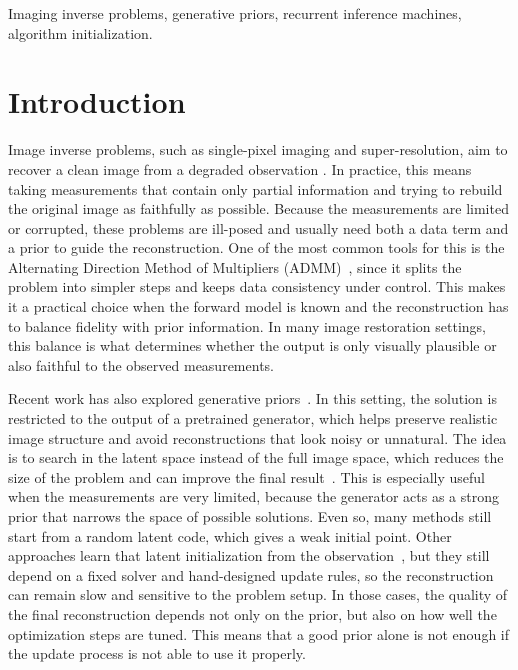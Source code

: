 \documentclass[conference]{IEEEtran}
\begin{document}
\begin{IEEEkeywords}
Imaging inverse problems, generative priors, recurrent inference machines, algorithm initialization.
\end{IEEEkeywords}

\section{Introduction}
Image inverse problems, such as single-pixel imaging and super-resolution, aim to recover a clean image from a degraded observation \cite{bertero2021introduction}. In practice, this means taking measurements that contain only partial information and trying to rebuild the original image as faithfully as possible. Because the measurements are limited or corrupted, these problems are ill-posed and usually need both a data term and a prior to guide the reconstruction. One of the most common tools for this is the Alternating Direction Method of Multipliers (ADMM)~\cite{neal2011distributed}, since it splits the problem into simpler steps and keeps data consistency under control. This makes it a practical choice when the forward model is known and the reconstruction has to balance fidelity with prior information. In many image restoration settings, this balance is what determines whether the output is only visually plausible or also faithful to the observed measurements.

Recent work has also explored generative priors~\cite{bora2017compressed, latorre2019fast}. In this setting, the solution is restricted to the output of a pretrained generator, which helps preserve realistic image structure and avoid reconstructions that look noisy or unnatural. The idea is to search in the latent space instead of the full image space, which reduces the size of the problem and can improve the final result~\cite{bora2017compressed}. This is especially useful when the measurements are very limited, because the generator acts as a strong prior that narrows the space of possible solutions. Even so, many methods still start from a random latent code, which gives a weak initial point. Other approaches learn that latent initialization from the observation~\cite{gutierrez2025learned}, but they still depend on a fixed solver and hand-designed update rules, so the reconstruction can remain slow and sensitive to the problem setup. In those cases, the quality of the final reconstruction depends not only on the prior, but also on how well the optimization steps are tuned. This means that a good prior alone is not enough if the update process is not able to use it properly.
\end{document}
